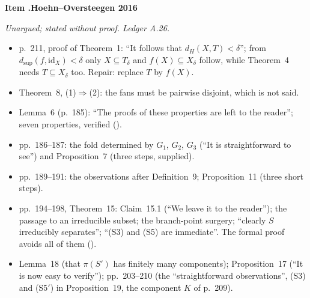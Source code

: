 \documentclass[11pt]{article}
\newcounter{defect}
\newenvironment{defect}[4]{%
  \par\addvspace{10pt}\refstepcounter{defect}%
  \noindent\textbf{Item \thedefect.\enspace #1}\par\nopagebreak
  \noindent\textit{#2}\par\nopagebreak\smallskip}{\par\addvspace{6pt}}
\begin{document}
\begin{defect}{Hoehn--Oversteegen 2016}{Unargued; stated without proof. Ledger A.26.}{0}{0}\label{it:un-ho}
\begin{itemize}
\item p.~211, proof of Theorem~1: ``It follows that $d_H(X,T)<\delta$''; from $d_{\sup}(f,
  \mathrm{id}_X)<\delta$ only $X\subseteq T_\delta$ and $f(X)\subseteq X_\delta$ follow, while
  Theorem~4 needs $T\subseteq X_\delta$ too. Repair: replace $T$ by $f(X)$.
\item Theorem~8, (1)$\Rightarrow$(2): the fans must be pairwise disjoint, which is not said.
\item Lemma~6 (p.~185): ``The proofs of these properties are left to the reader''; seven properties,
  verified ().
\item pp.~186--187: the fold determined by $G_1$, $G_2$, $G_3$ (``It is straightforward to see'') and
  Proposition~7 (three steps, supplied).
\item pp.~189--191: the observations after Definition~9; Proposition~11 (three short steps).
\item pp.~194--198, Theorem~15: Claim~15.1 (``We leave it to the reader''); the passage to an
  irreducible subset; the branch-point surgery; ``clearly $S$ irreducibly separates''; ``(S3) and
  (S5) are immediate''. The formal proof avoids all of them ().
\item Lemma~18 (that $\pi(S')$ has finitely many components); Proposition~17 (``It is now easy to
  verify''); pp.~203--210 (the ``straightforward observations'', (S3) and (S5$'$) in
  Proposition~19, the component $K$ of p.~209).
\end{itemize}
\end{defect}
\end{document}

